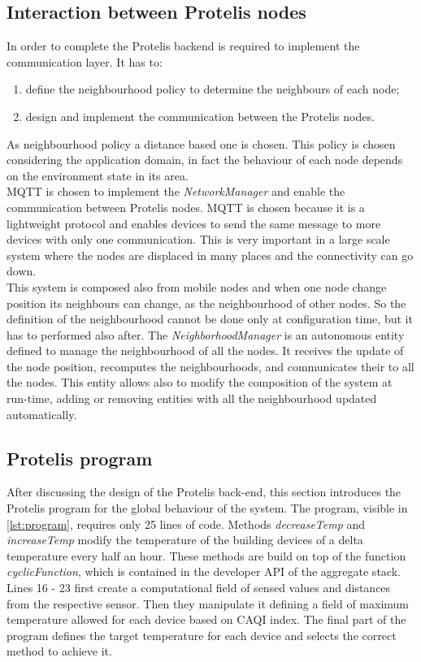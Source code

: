 \subsection*{Interaction between Protelis nodes}
In order to complete the Protelis backend is required to implement the communication layer. It has to:
\begin{enumerate}
    \item define the neighbourhood policy to determine the neighbours of each node;
    \item design and implement the communication between the Protelis nodes.
\end{enumerate}
As neighbourhood policy a distance based one is chosen. 
This policy is chosen considering the application domain, in fact the behaviour of each node depends on the environment state in its area.\\ 
MQTT is chosen to implement the \mbox{\textit{NetworkManager}} and enable the communication between Protelis nodes.
MQTT is chosen because it is a lightweight protocol and enables devices to send the same message to more devices with only one communication.
This is very important in a large scale system where the nodes are displaced in many places and the connectivity can go down. \\
This system is composed also from mobile nodes and when one node change position its neighbours can change, as the neighbourhood of other nodes. 
So the definition of the neighbourhood cannot be done only at configuration time, but it has to performed also after.
The \mbox{\textit{NeighborhoodManager}} is an autonomous entity defined to manage the neighbourhood of all the nodes.
It receives the update of the node position, recomputes the neighbourhoods, and communicates their to all the nodes. 
This entity allows also to modify the composition of the system at run-time, adding or removing entities with all the neighbourhood updated automatically.

\subsection{Protelis program}
After discussing the design of the Protelis back-end, this section introduces the Protelis program for the global behaviour of the system. 
The program, visible in \autoref{lst:program}, requires only 25 lines of code.
Methods \mbox{\textit{decreaseTemp}} and \mbox{\textit{increaseTemp}} modify the temperature of the building devices of a delta temperature every half an hour.
These methods are build on top of the function \mbox{\textit{cyclicFunction}}, which is contained in the developer API of the aggregate stack.
Lines 16 - 23 first create a computational field of sensed values and distances from the respective sensor. 
Then they manipulate it defining a field of maximum temperature allowed for each device based on CAQI index.
The final part of the program defines the target temperature for each device and selects the correct method to achieve it. 

